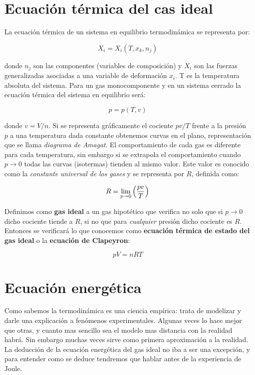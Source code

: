 \documentclass[12pt]{book}
\begin{document}
\section{Ecuación térmica del cas ideal}


La ecuación térmica de un sistema en equilibrio termodinámica se representa por:

\begin{equation}
X_i = X_i (T,x_k,n_j)
\end{equation}

donde $n_j$ son las componentes (variables de composición) y $X_i$ son las fuerzas generalizadas asociadas a una variable de deformación $x_i$. T es la temperatura absoluta del sistema. Para un gas monocomponente y en un sistema cerrado la ecuación térmica del sistema en equilibrio será:

\begin{equation}
p = p(T,v)
\end{equation}

donde $v=V/n$. Si se representa gráficamente el cociente $pv/T$ frente a la presión $p$ a una temperatura dada constante obtenemos curvas en el plano, representación que se llama \textit{diagrama de Amagat}. El comportamiento de cada gas es diferente para cada temperatura, sin embargo si se extrapola el comportamiento cuando $p \rightarrow 0$ todas las curvas (isotermas) tienden al mismo valor. Este valor es conocido como la \textit{constante universal de los gases} y se representa por $R$, definida como:

\begin{equation}
R = \lim_{p \rightarrow 0} \left( \dfrac{pv}{T} \right)
\end{equation}

Definimos como \textbf{gas ideal} a un gas hipotético que verifica no solo que si $p \rightarrow 0 $ dicho cociente tiende a $R$, si no que para \textit{cualquier} presión dicho cociente es $R$.  Entonces se verificará lo que conocemos como \textbf{ecuación térmica de estado del gas ideal} o la \textbf{ecuación de Clapeyron}:

\begin{equation}
pV = nRT
\end{equation}

\section{Ecuación energética}

Como sabemos la termodinámica es una ciencia empírica: trata de modelizar y darle una explicación a fenómenos experimentales. Algunas veces lo hace mejor que otras, y cuanto mas sencillo sea el modelo mas distancia con la realidad habrá. Sin embargo muchas veces sirve como primera aproximación a la realidad. La deducción de la ecuación energética del gas ideal no iba a ser una excepción, y para entender como se deduce tendremos que hablar antes de la experiencia de Joule. \\
\end{document}
